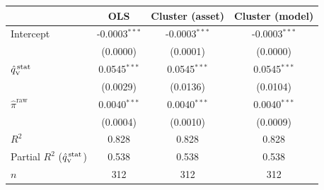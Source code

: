 \begin{tabular}{@{}l ccc@{}}
\hline\hline
 & OLS & Cluster (asset) & Cluster (model) \\
\hline
Intercept & -0.0003$^{***}$ & -0.0003$^{***}$ & -0.0003$^{***}$ \\
 & (0.0000) & (0.0001) & (0.0000) \\[3pt]
$\hat{q}_{\scriptscriptstyle\mathrm{V}}^{\,\mathrm{stat}}$ & 0.0545$^{***}$ & 0.0545$^{***}$ & 0.0545$^{***}$ \\
 & (0.0029) & (0.0136) & (0.0104) \\[3pt]
$\hat\pi^{\mathrm{raw}}$ & 0.0040$^{***}$ & 0.0040$^{***}$ & 0.0040$^{***}$ \\
 & (0.0004) & (0.0010) & (0.0009) \\[3pt]
\hline
$R^{2}$ & 0.828 & 0.828 & 0.828 \\
Partial $R^{2}$ ($\hat{q}_{\scriptscriptstyle\mathrm{V}}^{\,\mathrm{stat}}$) & 0.538 & 0.538 & 0.538 \\
$n$ & 312 & 312 & 312 \\
\hline\hline
\end{tabular}
